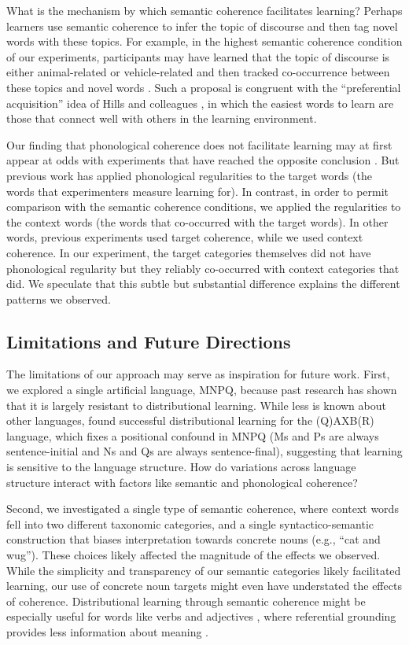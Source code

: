 \documentclass[man,floatsintext]{apa6}
\begin{document}
What is the mechanism by which semantic coherence facilitates learning? Perhaps learners use semantic coherence to infer the topic of discourse and then tag novel words with these topics. For example, in the highest semantic coherence condition of our experiments, participants may have learned that the topic of discourse is either animal-related or vehicle-related and then tracked co-occurrence between these topics and novel words \citep{frank2013}. Such a proposal is congruent with the ``preferential acquisition'' idea of Hills and colleagues \citeyearpar{hills2009, hills2010}, in which the easiest words to learn are those that connect well with others in the learning environment. 

Our finding that phonological coherence does not facilitate learning may at first appear at odds with experiments that have reached the opposite conclusion \citep{frigo1998, lany2010, monaghan2005}. But previous work has applied phonological regularities to the target words (the words that experimenters measure learning for).  In contrast, in order to permit comparison with the semantic coherence conditions, we applied the regularities to the context words (the words that co-occurred with the target words). In other words, previous experiments used target coherence, while we used context coherence. In our experiment, the target categories themselves did not have phonological regularity but they reliably co-occurred with context categories that did. We speculate that this subtle but substantial difference explains the different patterns we observed.

\subsection{Limitations and Future Directions}

The limitations of our approach may serve as inspiration for future work. First, we explored a single artificial language, MNPQ, because past research has shown that it is largely resistant to distributional learning. While less is known about other languages, \cite{reeder2009} found successful distributional learning for the (Q)AXB(R) language, which fixes a positional confound in MNPQ (Ms and Ps are always sentence-initial and Ns and Qs are always sentence-final), suggesting that learning is sensitive to the language structure. How do variations across language structure interact with factors like semantic and phonological coherence? 

Second, we investigated a single type of semantic coherence, where context words fell into two different taxonomic categories, and a single syntactico-semantic construction that biases interpretation towards concrete nouns (e.g., ``cat and wug''). These choices likely affected the magnitude of the effects we observed. While the simplicity and transparency of our semantic categories likely facilitated learning, our use of concrete noun targets might even have understated the effects of coherence. Distributional learning through semantic coherence might be especially useful for words like verbs and adjectives \citep{redington1998}, where referential grounding provides less information about meaning \citep{gleitman1990}.
\end{document}
